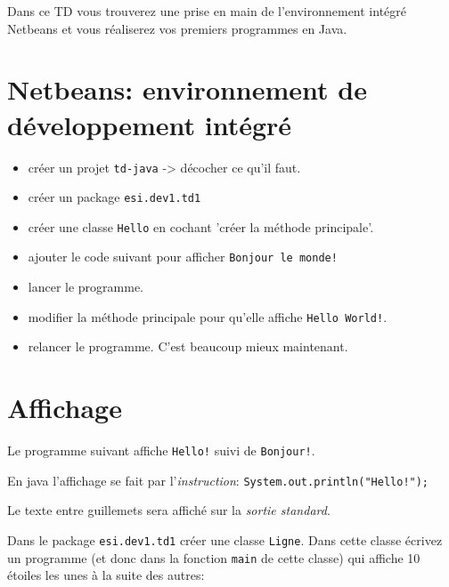 \documentclass[a4paper,11pt]{article}
\begin{document}
	\logo
	\entete
	\licence
	\lastedit
	\maketitle
	\setcounter{tocdepth}{3}

	Dans ce TD vous trouverez une prise en main de l'environnement intégré Netbeans et 
	vous réaliserez vos premiers programmes en Java.

	\tableofcontents

	\newpage

\section{Netbeans: environnement de développement intégré }

	\begin{itemize}
		\item créer un projet \texttt{td-java} -> décocher ce qu'il faut.
		\item créer un package \texttt{esi.dev1.td1}
		\item créer une classe \texttt{Hello} en cochant 'créer la méthode principale'.
		\item ajouter le code suivant pour afficher \texttt{Bonjour le monde!}
		\item lancer le programme.
		\item modifier la méthode principale pour qu'elle affiche \texttt{Hello World!}.
		\item relancer le programme. C'est beaucoup mieux maintenant.
	\end{itemize} 


\section{Affichage}

	Le programme suivant affiche \texttt{Hello!} suivi de \texttt{Bonjour!}.

	En java l'affichage se fait par l'\emph{instruction}: \texttt{System.out.println("Hello!");}
	
	Le texte entre guillemets sera affiché sur la \emph{sortie standard}.

	\hspeparator


	\Exercice{}
		Dans le package \texttt{esi.dev1.td1} créer une classe \texttt{Ligne}.
		Dans cette classe écrivez un programme  (et donc dans la fonction \texttt{main} de cette classe) 
		qui affiche 10 étoiles les unes à la suite des autres:
\end{document}
